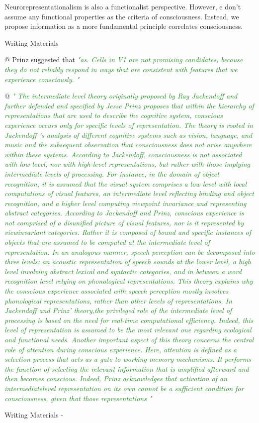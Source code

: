\documentclass[utf8]{article}
\newenvironment{WritingMaterials} %
    	{
            \begin{tcolorbox}[enhanced,
                title=-,
                size=small,
                colbacktitle=Aquamarine,
                drop fuzzy shadow,
                fontupper=\small,
                boxrule=0.4pt,
                colback=Aquamarine!10!white,
                sharp corners]
                Writing Materials
            \end{tcolorbox}
            \begin{easylist}[itemize]
    	}
    	{
            \end{easylist}  
            \begin{tcolorbox}[enhanced,
                halign=flush right,
                halign title=right,
                size=small,
                colbacktitle=Aquamarine,
                drop fuzzy shadow,
                fontupper=\small,
                boxrule=0.4pt,
                colback=Aquamarine,
                colupper=White,
                sharp corners]
                Writing Materials -
            \end{tcolorbox}        
    	}
\newcommand{\rewrite}[1]{\textcolor{ForestGreen}{\textit{"#1"}}\newline}
\begin{document}
			    Neurorepresentationalism is also a functionalist perspective. However, e don't assume any functional properties as the criteria of consciousness. Instead, we propose information as a more fundamental principle correlates consciousness.  
		        
		        
		        \begin{WritingMaterials}
				
				@ Prinz suggested that \rewrite{as. Cells in V1 are not promising candidates, because they do not reliably respond in ways that are consistent with features that we experience consciously. } \cite{prinz2007inter    mediate}
			    
				@ \rewrite{
					The intermediate level theory originally proposed by Ray Jackendoff and further defended and specified by Jesse Prinz proposes that within the hierarchy of representations that are used to describe the cognitive system, conscious experience occurs only for specific levels of representation. The theory is rooted in Jackendoff ’s analysis of different cognitive systems such as vision, language, and music and the subsequent observation that consciousness does not arise anywhere within these systems. According to Jackendoff, consciousness is not associated with low-level, nor with high-level representations, but rather with those implying intermediate levels of processing. For instance, in the domain of object recognition, it is assumed that the visual system comprises a low level with local computations of visual features, an intermediate level reflecting binding and object recognition, and a higher level computing viewpoint invariance and representing abstract categories. According to Jackendoff and Prinz, conscious experience is not comprised of a disunified picture of visual features, nor is it represented by viewinvariant categories. Rather it is composed of bound and specific instances of objects that are assumed to be computed at the intermediate level of representation. In an analogous manner, speech perception can be decomposed into three levels: an acoustic representation of speech sounds at the lower level, a high level involving abstract lexical and syntactic categories, and in between a word recognition level relying on phonological representations. This theory explains why the conscious experience associated with speech perception mostly involves phonological representations, rather than other levels of representations. In Jackendoff and Prinz’ theory,the privileged role of the intermediate level of processing is based on the need for real-time computational efficiency. Indeed, this level of representation is assumed to be the most relevant one regarding ecological and functional needs. Another important aspect of this theory concerns the central role of attention during conscious experience. Here, attention is defined as a selection process that acts as a gate to working memory mechanisms. It performs the function of selecting the relevant information that is amplified afterward and then becomes conscious. Indeed, Prinz acknowledges that activation of an intermediatelevel representation on its own cannot be a sufficient condition for consciousness, given that those representations }
\end{WritingMaterials}
\end{document}
